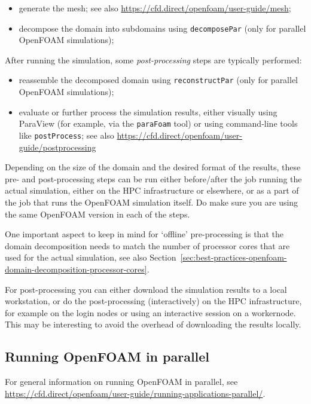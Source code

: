 \begin{itemize}
\item generate the mesh; see also {\small\url{https://cfd.direct/openfoam/user-guide/mesh}};
\item decompose the domain into subdomains using {\small\texttt{decomposePar}} (only for parallel OpenFOAM simulations);
\end{itemize}

After running the simulation, some \textit{post-processing} steps are typically performed:

\begin{itemize}
\item reassemble the decomposed domain using {\small\texttt{reconstructPar}} (only for parallel OpenFOAM simulations);
\item evaluate or further process the simulation results, either visually using ParaView
      (for example, via the {\small\texttt{paraFoam}} tool) or using command-line tools like {\small\texttt{postProcess}};
      see also {\small\url{https://cfd.direct/openfoam/user-guide/postprocessing}}

\end{itemize}

Depending on the size of the domain and the desired format of the results, these pre- and post-processing
steps can be run either before/after the job running the actual simulation, either on the HPC infrastructure
or elsewhere, or as a part of the job that runs the OpenFOAM simulation itself.
Do make sure you are using the same OpenFOAM version in each of the steps.

One important aspect to keep in mind for `offline' pre-processing is that the domain decomposition needs to match
the number of processor cores that are used for the actual simulation,
see also Section~\ref{sec:best-practices-openfoam-domain-decomposition-processor-cores}.

For post-processing you can either download the simulation results to a local workstation,
or do the post-processing (interactively) on the HPC infrastructure, for example on the login nodes
or using an interactive session on a workernode. This may be interesting to avoid the overhead of
downloading the results locally.


\subsection{Running OpenFOAM in parallel}

For general information on running OpenFOAM in parallel,
see {\small\url{https://cfd.direct/openfoam/user-guide/running-applications-parallel/}}.

